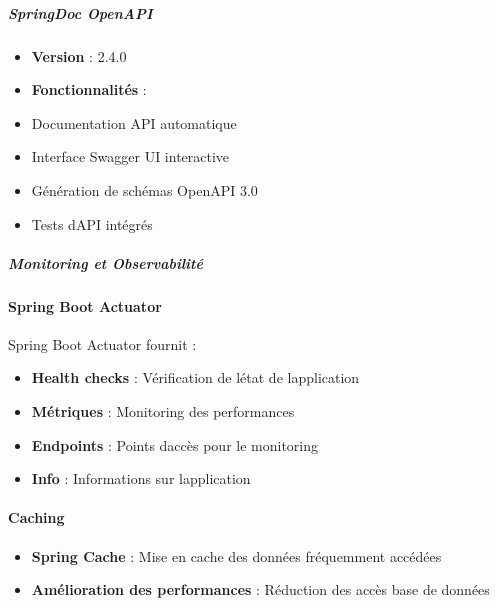 \documentclass[12pt,a4paper,twoside,openright]{report}
\begin{document}
\hypertarget{springdoc-openapi}{%
\subparagraph{SpringDoc OpenAPI}\label{springdoc-openapi}}

\begin{itemize}
\item
  \textbf{Version} : 2.4.0
\item
  \textbf{Fonctionnalités} :
\end{itemize}

\begin{itemize}
\item
  Documentation API automatique
\item
  Interface Swagger UI interactive
\item
  Génération de schémas OpenAPI 3.0
\item
  Tests d\textquotesingle API intégrés
\end{itemize}

\hypertarget{monitoring-et-observabilituxe9}{%
\subparagraph{Monitoring et
Observabilité}\label{monitoring-et-observabilituxe9}}

\hypertarget{spring-boot-actuator}{%
\paragraph{Spring Boot Actuator}\label{spring-boot-actuator}}

Spring Boot Actuator fournit :

\begin{itemize}
\item
  \textbf{Health checks} : Vérification de l\textquotesingle état de
  l\textquotesingle application
\item
  \textbf{Métriques} : Monitoring des performances
\item
  \textbf{Endpoints} : Points d\textquotesingle accès pour le monitoring
\item
  \textbf{Info} : Informations sur l\textquotesingle application
\end{itemize}

\hypertarget{caching}{%
\paragraph{Caching}\label{caching}}

\begin{itemize}
\item
  \textbf{Spring Cache} : Mise en cache des données fréquemment accédées
\item
  \textbf{Amélioration des performances} : Réduction des accès base de
  données
\end{itemize}
\end{document}
